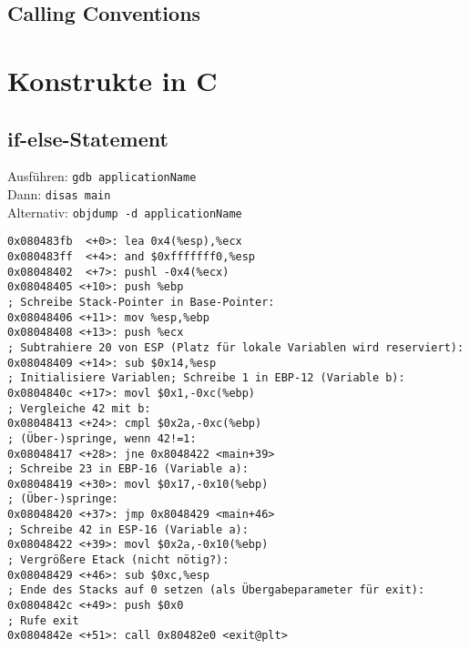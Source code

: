 \subsection{Calling Conventions}

\section{Konstrukte in C}

\subsection{if-else-Statement}
Ausführen: \lstinline`gdb applicationName`\\
Dann: \lstinline`disas main`\\
Alternativ: \lstinline`objdump -d applicationName`
\begin{lstlisting}[language={[x86masm]Assembler}]
0x080483fb 	<+0>: lea 0x4(%esp),%ecx
0x080483ff 	<+4>: and $0xfffffff0,%esp
0x08048402 	<+7>: pushl -0x4(%ecx)
0x08048405 <+10>: push %ebp
; Schreibe Stack-Pointer in Base-Pointer:
0x08048406 <+11>: mov %esp,%ebp
0x08048408 <+13>: push %ecx
; Subtrahiere 20 von ESP (Platz für lokale Variablen wird reserviert):
0x08048409 <+14>: sub $0x14,%esp
; Initialisiere Variablen; Schreibe 1 in EBP-12 (Variable b):
0x0804840c <+17>: movl $0x1,-0xc(%ebp)
; Vergleiche 42 mit b:
0x08048413 <+24>: cmpl $0x2a,-0xc(%ebp)
; (Über-)springe, wenn 42!=1:
0x08048417 <+28>: jne 0x8048422 <main+39>
; Schreibe 23 in EBP-16 (Variable a):
0x08048419 <+30>: movl $0x17,-0x10(%ebp)
; (Über-)springe:
0x08048420 <+37>: jmp 0x8048429 <main+46>
; Schreibe 42 in ESP-16 (Variable a):
0x08048422 <+39>: movl $0x2a,-0x10(%ebp)
; Vergrößere Etack (nicht nötig?):
0x08048429 <+46>: sub $0xc,%esp
; Ende des Stacks auf 0 setzen (als Übergabeparameter für exit):
0x0804842c <+49>: push $0x0
; Rufe exit
0x0804842e <+51>: call 0x80482e0 <exit@plt>
\end{lstlisting}

